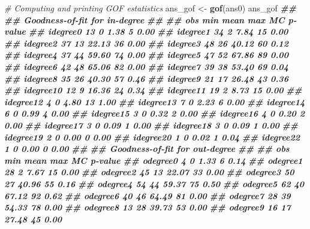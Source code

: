 \documentclass[
]{book}
\newenvironment{Shaded}{\begin{snugshade}}{\end{snugshade}}
\newcommand{\CommentTok}[1]{\textcolor[rgb]{0.56,0.35,0.01}{\textit{#1}}}
\newcommand{\DocumentationTok}[1]{\textcolor[rgb]{0.56,0.35,0.01}{\textbf{\textit{#1}}}}
\newcommand{\FunctionTok}[1]{\textcolor[rgb]{0.13,0.29,0.53}{\textbf{#1}}}
\newcommand{\NormalTok}[1]{#1}
\newcommand{\OtherTok}[1]{\textcolor[rgb]{0.56,0.35,0.01}{#1}}
\begin{document}
\begin{Shaded}
\begin{Highlighting}[]
\CommentTok{\# Computing and printing GOF estatistics}
\NormalTok{ans\_gof }\OtherTok{\textless{}{-}} \FunctionTok{gof}\NormalTok{(ans0)}
\NormalTok{ans\_gof}
\DocumentationTok{\#\# }
\DocumentationTok{\#\# Goodness{-}of{-}fit for in{-}degree }
\DocumentationTok{\#\# }
\DocumentationTok{\#\#           obs min  mean max MC p{-}value}
\DocumentationTok{\#\# idegree0   13   0  1.38   5       0.00}
\DocumentationTok{\#\# idegree1   34   2  7.84  15       0.00}
\DocumentationTok{\#\# idegree2   37  13 22.13  36       0.00}
\DocumentationTok{\#\# idegree3   48  26 40.12  60       0.12}
\DocumentationTok{\#\# idegree4   37  44 59.60  74       0.00}
\DocumentationTok{\#\# idegree5   47  52 67.86  89       0.00}
\DocumentationTok{\#\# idegree6   42  48 65.06  82       0.00}
\DocumentationTok{\#\# idegree7   39  38 53.40  69       0.04}
\DocumentationTok{\#\# idegree8   35  26 40.30  57       0.46}
\DocumentationTok{\#\# idegree9   21  17 26.48  43       0.36}
\DocumentationTok{\#\# idegree10  12   9 16.36  24       0.34}
\DocumentationTok{\#\# idegree11  19   2  8.73  15       0.00}
\DocumentationTok{\#\# idegree12   4   0  4.80  13       1.00}
\DocumentationTok{\#\# idegree13   7   0  2.23   6       0.00}
\DocumentationTok{\#\# idegree14   6   0  0.99   4       0.00}
\DocumentationTok{\#\# idegree15   3   0  0.32   2       0.00}
\DocumentationTok{\#\# idegree16   4   0  0.20   2       0.00}
\DocumentationTok{\#\# idegree17   3   0  0.09   1       0.00}
\DocumentationTok{\#\# idegree18   3   0  0.09   1       0.00}
\DocumentationTok{\#\# idegree19   2   0  0.00   0       0.00}
\DocumentationTok{\#\# idegree20   1   0  0.02   1       0.04}
\DocumentationTok{\#\# idegree22   1   0  0.00   0       0.00}
\DocumentationTok{\#\# }
\DocumentationTok{\#\# Goodness{-}of{-}fit for out{-}degree }
\DocumentationTok{\#\# }
\DocumentationTok{\#\#           obs min  mean max MC p{-}value}
\DocumentationTok{\#\# odegree0    4   0  1.33   6       0.14}
\DocumentationTok{\#\# odegree1   28   2  7.67  15       0.00}
\DocumentationTok{\#\# odegree2   45  13 22.07  33       0.00}
\DocumentationTok{\#\# odegree3   50  27 40.96  55       0.16}
\DocumentationTok{\#\# odegree4   54  44 59.37  75       0.50}
\DocumentationTok{\#\# odegree5   62  40 67.12  92       0.62}
\DocumentationTok{\#\# odegree6   40  46 64.49  81       0.00}
\DocumentationTok{\#\# odegree7   28  39 54.33  78       0.00}
\DocumentationTok{\#\# odegree8   13  28 39.73  53       0.00}
\DocumentationTok{\#\# odegree9   16  17 27.48  45       0.00}

\end{Highlighting}
\end{Shaded}
\end{document}
